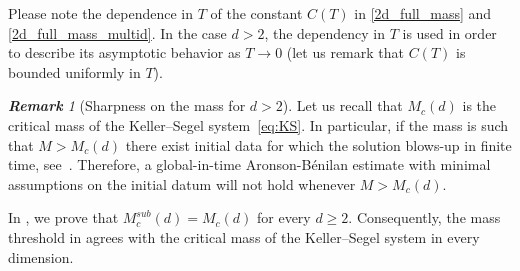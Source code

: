 \documentclass[11pt,a4paper]{article}
\numberwithin{equation}{section}
\newcommand{\ee}{\varepsilon}
\theoremstyle{plain}
\theoremstyle{remark}
\newtheorem{remark}[theorem]{\bf Remark}
\begin{document}


Please note the dependence in $T$ of the constant $C(T)$ in \ref{2d_full_mass} and \ref{2d_full_mass_multid}. In the case $d>2$, the dependency in $T$ is used in order to describe its asymptotic behavior as $T\to 0$ (let us remark that $C(T)$ is bounded uniformly in $T$). 

\begin{remark}
[Sharpness on the mass for $d > 2$]
Let us recall that $M_c(d)$ is the critical mass of the Keller--Segel system~\eqref{eq:KS}. In particular, if the mass is such that $M > M_c(d)$ there exist initial data for which the solution blows-up in finite time, see~\cite{Blanchet_Carrillo_Laurencot09}. Therefore, a global-in-time Aronson-B\'enilan estimate with minimal assumptions on the initial datum will not hold whenever $M > M_c(d)$. 

In , we prove that
$M_c^{sub}(d)=M_c(d)$ for every $d\ge2$. Consequently, the mass
threshold in  agrees with the critical mass of the Keller--Segel system in every dimension.
\end{remark}
\end{document}
